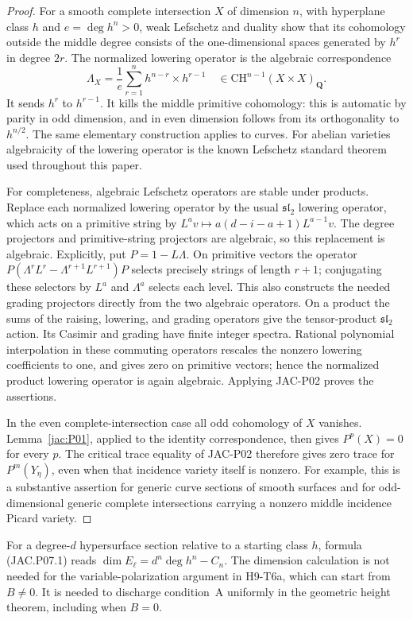\begin{proof}
For a smooth complete intersection $X$ of dimension $n$, with
hyperplane class $h$ and $e=\deg h^n>0$, weak Lefschetz and duality
show that its cohomology outside the middle degree consists of the
one-dimensional spaces generated by $h^r$ in degree $2r$.
The normalized lowering operator is the algebraic correspondence
\[
 \Lambda_X=\frac1e\sum_{r=1}^{n}
           h^{n-r}\times h^{r-1}
 \quad\in\mathrm{CH}^{n-1}(X\times X)_{\mathbf Q}.
\]
It sends $h^r$ to $h^{r-1}$.  It kills the middle primitive
cohomology: this is automatic by parity in odd dimension, and in
even dimension follows from its orthogonality to $h^{n/2}$.
The same elementary construction applies to curves.  For abelian
varieties algebraicity of the lowering operator is the known
Lefschetz standard theorem used throughout this paper.

For completeness, algebraic Lefschetz operators are stable under
products.  Replace each normalized lowering operator by the usual
$\mathfrak{sl}_2$ lowering operator, which acts on a primitive string
by $L^av\mapsto a(d-i-a+1)L^{a-1}v$.  The degree projectors and
primitive-string projectors are algebraic, so this replacement is
algebraic.  Explicitly, put $P=1-L\Lambda$. On primitive vectors the
operator
$P(\Lambda^rL^r-\Lambda^{r+1}L^{r+1})P$ selects precisely strings
of length $r+1$; conjugating these selectors by $L^a$ and
$\Lambda^a$ selects each level. This also constructs the needed
grading projectors directly from the two algebraic operators.
On a product the sums of the raising, lowering, and
grading operators give the tensor-product $\mathfrak{sl}_2$ action.
Its Casimir and grading have finite integer spectra.  Rational
polynomial interpolation in these commuting operators rescales the
nonzero lowering coefficients to one, and gives zero on primitive
vectors; hence the normalized product lowering operator is again
algebraic.  Applying JAC-P02 proves the assertions.

In the even complete-intersection case all odd cohomology of $X$
vanishes.  Lemma~\ref{jac:P01}, applied to the identity correspondence,
then gives $P^p(X)=0$ for every $p$.  The critical trace equality
of JAC-P02 therefore gives zero trace for $P^m(Y_\eta)$, even when
that incidence variety itself is nonzero.  For example, this is a
substantive assertion for generic curve sections of smooth surfaces
and for odd-dimensional generic complete intersections carrying a
nonzero middle incidence Picard variety.
\end{proof}

For a degree-$d$ hypersurface section relative to a starting class
$h$, formula (JAC.P07.1) reads
$\dim E_\ell=d^n\deg h^n-C_n$.  The dimension calculation is not
needed for the variable-polarization argument in H9-T6a, which can
start from $B\ne0$.  It is needed to discharge condition~A uniformly
in the geometric height theorem, including when $B=0$.
